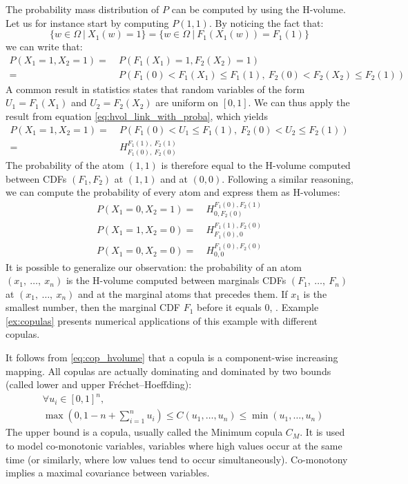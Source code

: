 \begin{example}
    The probability mass distribution of $P$ can be computed by using the H-volume. Let us for instance start by computing $P(1,1)$. By noticing the fact that:
    \begin{equation*}
        \{w\in\Omega~|~X_1(w)=1\}=\{w\in\Omega~|~F_1(X_1(w))=F_1(1)\}
    \end{equation*}
    we can write that:
    \begin{align*}
        P(X_1 = 1, X_2=1) =& ~P(F_1(X_1)= 1, F_2(X_2) = 1)\\
        =& ~P(F_1(0) < F_1(X_1)\leqslant F_1(1), ~F_2(0) < F_2(X_2)\leqslant F_2(1))
    \end{align*}
    A common result in statistics states that random variables of the form $U_1=F_1(X_1)$ and $U_2=F_2(X_2)$ are uniform on $[0,1]$. We can thus apply the result from equation \eqref{eq:hvol_link_with_proba}, which yields
    \begin{align*}
        P(X_1 = 1, X_2=1) =& ~P(F_1(0) < U_1 \leqslant F_1(1), ~F_2(0) < U_2 \leqslant F_2(1))\\
        =& ~H^{F_1(1),~F_2(1)}_{F_1(0),~F_2(0)}
    \end{align*}
    The probability of the atom $(1,1)$ is therefore equal to the H-volume computed between CDFs $(F_1, F_2)$ at $(1, 1)$ and at $(0,0)$. Following a similar reasoning, we can compute the probability of every atom and express them as H-volumes:
    \begin{align*}
        P(X_1=0, X_2=1) =& ~H_{0, F_2(0)}^{F_1(0), F_2(1)}\\
        P(X_1=1, X_2=0) =& ~H_{F_1(0), 0}^{F_1(1), F_2(0)}\\
        P(X_1=0, X_2=0) =& ~H_{0,0}^{F_1(0), F_2(0)}
    \end{align*}
    It is possible to generalize our observation: the probability of an atom $(x_1,~\dots,~x_n)$ is the H-volume computed between marginals CDFs $(F_1,~\dots,~F_n)$ at $(x_1,~\dots,~x_n)$ and at the marginal atoms that precedes them. If $x_1$ is the smallest number, then the marginal CDF $F_1$ before it equals $0$, \etc.
    Example \ref{ex:copulas} presents numerical applications of this example with different copulas.
\end{example}

It follows from \eqref{eq:cop_hvolume} that a copula is a component-wise increasing mapping. All copulas are actually dominating and dominated by two bounds (called lower and upper Fréchet–Hoeffding):
\begin{align}
    &\forall u_i \in [0,1]^n,\nonumber\\
    &\max(0, 1-n+\sum_{i=1}^n u_i) \leqslant C(u_1,\dots,u_n) \leqslant \min(u_1, \dots, u_n)
\end{align}
The upper bound is a copula, usually called the Minimum copula $C_M$. It is used to model co-monotonic variables, \ie variables where high values occur at the same time (or similarly, where low values tend to occur simultaneously). Co-monotony implies a maximal covariance between variables.

